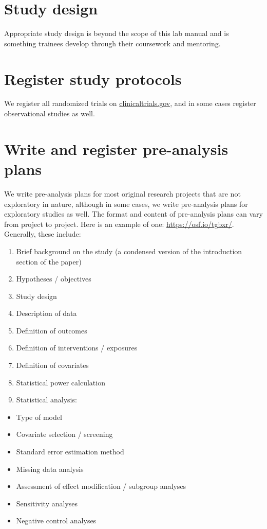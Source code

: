 \documentclass[
]{book}
\providecommand{\tightlist}{%
  \setlength{\itemsep}{0pt}\setlength{\parskip}{0pt}}
\begin{document}
\section{Study design}\label{study-design}

Appropriate study design is beyond the scope of this lab manual and is something trainees develop through their coursework and mentoring.

\section{Register study protocols}\label{register-study-protocols}

We register all randomized trials on \url{clinicaltrials.gov}, and in some cases register observational studies as well.

\section{Write and register pre-analysis plans}\label{write-and-register-pre-analysis-plans}

We write pre-analysis plans for most original research projects that are not exploratory in nature, although in some cases, we write pre-analysis plans for exploratory studies as well. The format and content of pre-analysis plans can vary from project to project. Here is an example of one: \url{https://osf.io/tgbxr/}. Generally, these include:

\begin{enumerate}
\def\labelenumi{\arabic{enumi}.}
\tightlist
\item
  Brief background on the study (a condensed version of the introduction section of the paper)
\item
  Hypotheses / objectives
\item
  Study design
\item
  Description of data
\item
  Definition of outcomes
\item
  Definition of interventions / exposures
\item
  Definition of covariates
\item
  Statistical power calculation
\item
  Statistical analysis:
\end{enumerate}

\begin{itemize}
\tightlist
\item
  Type of model
\item
  Covariate selection / screening
\item
  Standard error estimation method
\item
  Missing data analysis
\item
  Assessment of effect modification / subgroup analyses
\item
  Sensitivity analyses
\item
  Negative control analyses
\end{itemize}
\end{document}
